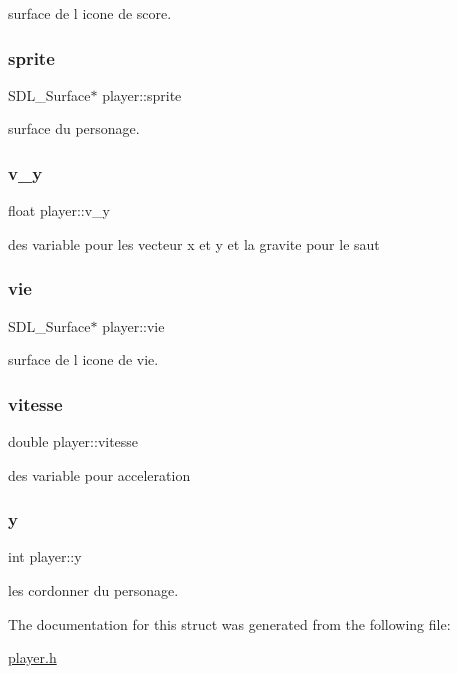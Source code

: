 surface de l icone de score. \mbox{\label{structplayer_a8eb447d983b58372fbda6acabc8debf7}} 
\subsubsection{\texorpdfstring{sprite}{sprite}}
{\footnotesize\ttfamily S\+D\+L\+\_\+\+Surface$\ast$ player\+::sprite}

surface du personage. \mbox{\label{structplayer_a0b4769151ecb3fe4c2b30e6edf7a806b}} 
\subsubsection{\texorpdfstring{v\+\_\+y}{v\_y}}
{\footnotesize\ttfamily float player\+::v\+\_\+y}

des variable pour les vecteur x et y et la gravite pour le saut \mbox{\label{structplayer_acb0feb6ffa46f0e9f353855fc9d7eb42}} 
\subsubsection{\texorpdfstring{vie}{vie}}
{\footnotesize\ttfamily S\+D\+L\+\_\+\+Surface$\ast$ player\+::vie}

surface de l icone de vie. \mbox{\label{structplayer_a824955d2f59f876154c6d1ce0de0b514}} 
\subsubsection{\texorpdfstring{vitesse}{vitesse}}
{\footnotesize\ttfamily double player\+::vitesse}

des variable pour acceleration \mbox{\label{structplayer_ab1da25240a30a5563d4e0714dade1575}} 
\subsubsection{\texorpdfstring{y}{y}}
{\footnotesize\ttfamily int player\+::y}

les cordonner du personage. 

The documentation for this struct was generated from the following file\+:\begin{DoxyCompactItemize}
\item 
\hyperlink{player_8h}{player.\+h}\end{DoxyCompactItemize}

